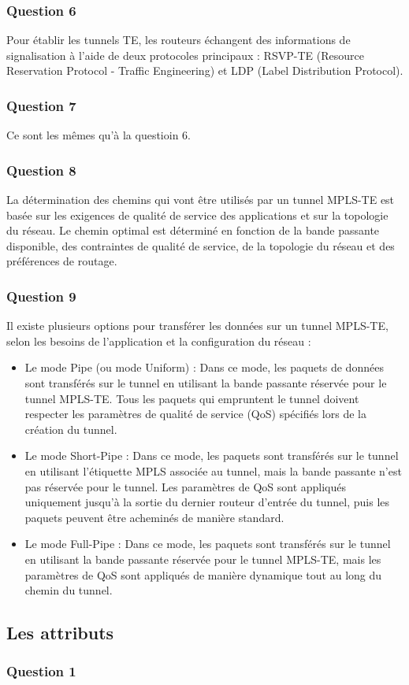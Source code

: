\documentclass[12pt, a4paper]{article}
\begin{document}
		\subsubsection{Question 6}
		Pour établir les tunnels TE, les routeurs échangent des 
		informations de signalisation à l'aide de deux protocoles
		principaux : RSVP-TE (Resource Reservation Protocol - Traffic 
		Engineering) et LDP (Label Distribution Protocol).

		\subsubsection{Question 7}
		Ce sont les mêmes qu'à la questioin 6. 

		\subsubsection{Question 8}
		La détermination des chemins qui vont être utilisés par un tunnel 
		MPLS-TE est basée sur les exigences de qualité de service des 
		applications et sur la topologie du réseau. Le chemin optimal est 
		déterminé en fonction de la bande passante disponible, des contraintes 
		de qualité de service, de la topologie du réseau et des préférences 
		de routage.

		\newpage
		\subsubsection{Question 9}
		Il existe plusieurs options pour transférer les données sur un 
		tunnel MPLS-TE, selon les besoins de l'application et la configuration
		du réseau :\\
		\begin{itemize}
			\item Le mode Pipe (ou mode Uniform) : Dans ce mode, les paquets de données sont transférés sur le tunnel en utilisant la bande passante réservée pour le tunnel MPLS-TE. Tous les paquets qui empruntent le tunnel doivent respecter les paramètres de qualité de service (QoS) spécifiés lors de la création du tunnel.
			\item Le mode Short-Pipe : Dans ce mode, les paquets sont transférés sur le tunnel en utilisant l'étiquette MPLS associée au tunnel, mais la bande passante n'est pas réservée pour le tunnel. Les paramètres de QoS sont appliqués uniquement jusqu'à la sortie du dernier routeur d'entrée du tunnel, puis les paquets peuvent être acheminés de manière standard.
			\item Le mode Full-Pipe : Dans ce mode, les paquets sont transférés sur le tunnel en utilisant la bande passante réservée pour le tunnel MPLS-TE, mais les paramètres de QoS sont appliqués de manière dynamique tout au long du chemin du tunnel.
		\end{itemize}

		\subsection{Les attributs}
		\subsubsection{Question 1}
		
\end{document}
